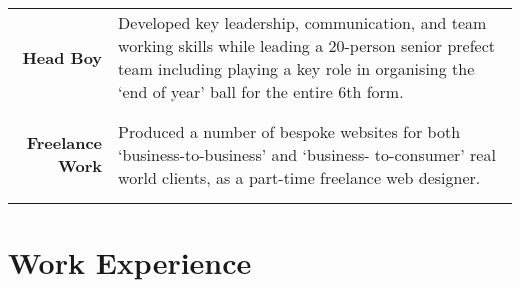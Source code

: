 \documentclass[a4paper, 10pt]{extarticle} %
\begin{document}
\begin{small}
\begin{tabular}{r | p{12cm}}
	\begin{minipage}[t]{2.5cm}
		\begin{flushright}
			\textbf{Head Boy}
		\end{flushright}
		\end{minipage} 
		
		& 
		
		Developed key leadership, communication, and team working skills while leading a 20-person senior prefect team including playing a key role in organising the `end of year' ball for the entire 6th form. \\

	\multicolumn{2}{c}{} \\
	
		\begin{minipage}[t]{2.5cm}
		\begin{flushright}
			\textbf{Freelance Work}
		\end{flushright}
		\end{minipage} 
		
		& 
		
		Produced a number of bespoke websites for both `business-to-business' and `business- to-consumer' real world clients, as a part-time freelance web designer. \\

	\multicolumn{2}{c}{} \\

\end{tabular}
\end{small}



\section{Work Experience}
\end{document}
